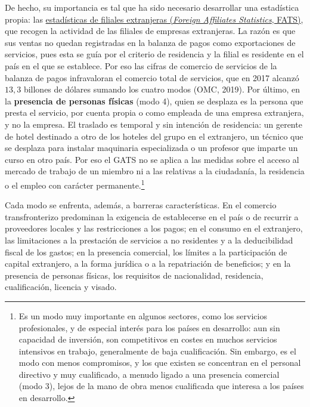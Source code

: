 \documentclass[10pt,a4paper]{article}
\begin{document}
{    De hecho, su importancia es tal que ha sido necesario desarrollar una estadística propia: las \href{https://www.elibrary.imf.org/display/book/9781589061286/ch04.xml}{estadísticas de filiales extranjeras (\textit{Foreign Affiliates Statistics}, FATS)}, que recogen la actividad de las filiales de empresas extranjeras. La razón es que sus ventas no quedan registradas en la balanza de pagos como exportaciones de servicios, pues esta se guía por el criterio de residencia y la filial es residente en el país en el que se establece. Por eso las cifras de comercio de servicios de la balanza de pagos infravaloran el comercio total de servicios, que en 2017 alcanzó $13,3$ billones de dólares sumando los cuatro modos (OMC, 2019).
} Por último, en la \textbf{presencia de personas físicas} (modo 4), quien se desplaza es la persona que presta el servicio, por cuenta propia o como empleada de una empresa extranjera, y no la empresa. El traslado es temporal y sin intención de residencia: un gerente de hotel destinado a otro de los hoteles del grupo en el extranjero, un técnico que se desplaza para instalar maquinaria especializada o un profesor que imparte un curso en otro país. Por eso el GATS no se aplica a las medidas sobre el acceso al mercado de trabajo de un miembro ni a las relativas a la ciudadanía, la residencia o el empleo con carácter permanente.\footnote{%
  Es un modo muy importante en algunos sectores, como los servicios profesionales, y de especial interés para los países en desarrollo: aun sin capacidad de inversión, son competitivos en costes en muchos servicios intensivos en trabajo, generalmente de baja cualificación. Sin embargo, es el modo con menos compromisos, y los que existen se concentran en el personal directivo y muy cualificado, a menudo ligado a una presencia comercial (modo 3), lejos de la mano de obra menos cualificada que interesa a los países en desarrollo.
}

Cada modo se enfrenta, además, a barreras características. En el comercio transfronterizo predominan la exigencia de establecerse en el país o de recurrir a proveedores locales y las restricciones a los pagos; en el consumo en el extranjero, las limitaciones a la prestación de servicios a no residentes y a la deducibilidad fiscal de los gastos; en la presencia comercial, los límites a la participación de capital extranjero, a la forma jurídica o a la repatriación de beneficios; y en la presencia de personas físicas, los requisitos de nacionalidad, residencia, cualificación, licencia y visado.
\end{document}
